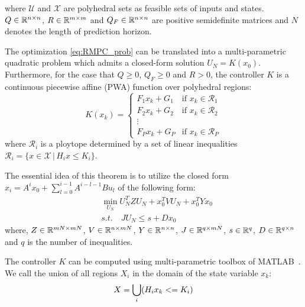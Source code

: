 where $\mathcal U$ and $\mathcal X$ are polyhedral sets as feasible sets of inputs and states. $Q\in\mathbb{R}^{n\times n}$, $R\in\mathbb{R}^{m\times m}$ and $Q_F\in\mathbb{R}^{n\times n}$ are positive semidefinite matrices and $N$ denotes the length of prediction horizon.
\begin{theorem}
The optimization  \eqref{eq:RMPC_prob} can be translated into a multi-parametric quadratic problem which admits a closed-form solution $U_N=K(x_0)$. Furthermore, for the case that $Q\geq0$, $Q_F\geq0$ and $R>0$, the controller $K$ is a continuous piecewise affine (PWA) function over polyhedral regions:
\begin{equation}
K(x_k)=
\begin{cases}
F_1x_k+G_1 & \text{if $x_k\in \mathcal{R}_1$}\\
F_2x_k+G_2 & \text{if $x_k\in \mathcal{R}_2$}\\
\vdots\\
F_Px_k+G_P & \text{if $x_k\in \mathcal{R}_P$}
\end{cases} 
\end{equation}
where $\mathcal{R}_i$ is a ploytope determined by a set of linear inequalities $\mathcal R_i = \{x\in\mathcal X\,|\,H_ix\leq K_i\}$. 
\end{theorem}
The essential idea of this theorem is to utilize the closed form $x_i=A^ix_0+\sum_{l=0}^{i-1}A^{i-l-1}Bu_l$ of the following form:
\begin{align}
	&\min_{U_N}U_N^TZU_N+x_0^TVU_N+x_0^TYx_0\nonumber\\
	&s.t.\quad JU_N\leq s+Dx_0
\end{align} 
where, $Z\in \mathbb{R}^{mN\times mN}$, $V\in\mathbb{R}^{n\times mN}$, $Y\in\mathbb{R}^{n\times n}$, $J\in\mathbb{R}^{q\times mN}$, $s\in\mathbb{R}^{q}$, $D\in\mathbb{R}^{q\times n}$ and $q$ is the number of inequalities.


The controller $K$ can be computed using multi-parametric toolbox of MATLAB~\cite{matlabMPT, matlabYALMIP}. We call \statespace\space the union of all regions $X_{i}$ in the domain of the state variable $x_{k}$:
\begin{equation}
X = \bigcup_{i}(H_{i}x_{k}<=K_{i})
\end{equation}

